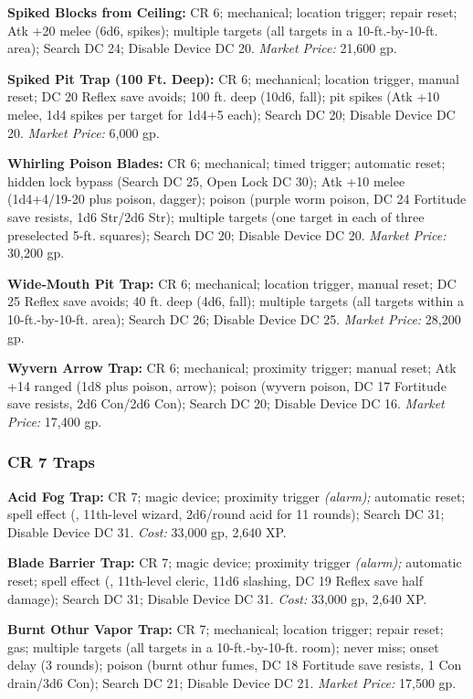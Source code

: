 \textbf{Spiked Blocks from Ceiling:} CR 6; mechanical; location trigger; repair 
reset; Atk +20 melee (6d6, spikes); multiple targets (all targets in a 10-ft.-by-10-ft. 
area); Search DC 24; Disable Device DC 20. \textit{Market Price:} 21,600 gp.

\textbf{Spiked Pit Trap (100 Ft. Deep):} CR 6; mechanical; location trigger, manual 
reset; DC 20 Reflex save avoids; 100 ft. deep (10d6, fall); pit spikes (Atk +10 
melee, 1d4 spikes per target for 1d4+5 each); Search DC 20; Disable Device DC 20. 
\textit{Market Price:} 6,000 gp.

\textbf{Whirling Poison Blades:} CR 6; mechanical; timed trigger; automatic reset; 
hidden lock bypass (Search DC 25, Open Lock DC 30); Atk +10 melee (1d4+4/19-20 
plus poison, dagger); poison (purple worm poison, DC 24 Fortitude save resists, 
1d6 Str/2d6 Str); multiple targets (one target in each of three preselected 5-ft. 
squares); Search DC 20; Disable Device DC 20. \textit{Market Price:} 30,200 gp.

\textbf{Wide-Mouth Pit Trap:} CR 6; mechanical; location trigger, manual reset; 
DC 25 Reflex save avoids; 40 ft. deep (4d6, fall); multiple targets (all targets 
within a 10-ft.-by-10-ft. area); Search DC 26; Disable Device DC 25. \textit{Market 
Price:} 28,200 gp.

\textbf{Wyvern Arrow Trap:} CR 6; mechanical; proximity trigger; manual reset; 
Atk +14 ranged (1d8 plus poison, arrow); poison (wyvern poison, DC 17 Fortitude 
save resists, 2d6 Con/2d6 Con); Search DC 20; Disable Device DC 16. \textit{Market 
Price:} 17,400 gp. 

\subsubsection{CR 7 Traps}

\textbf{Acid Fog Trap:} CR 7; magic device; proximity trigger 
\textit{(alarm); }automatic reset; spell effect (, 11th-level 
wizard, 2d6/round acid for 11 rounds); Search DC 31; Disable Device DC 31. \textit{Cost: 
}33,000 gp, 2,640 XP.

\textbf{Blade Barrier Trap:} CR 7; magic device; proximity trigger 
\textit{(alarm); }automatic reset; spell effect (, 11th-level 
cleric, 11d6 slashing, DC 19 Reflex save half damage); Search DC 31; Disable Device 
DC 31. \textit{Cost:} 33,000 gp, 2,640 XP.

\textbf{Burnt Othur Vapor Trap:} CR 7; mechanical; location trigger; repair reset; 
gas; multiple targets (all targets in a 10-ft.-by-10-ft. room); never miss; onset 
delay (3 rounds); poison (burnt othur fumes, DC 18 Fortitude save resists, 1 Con 
drain/3d6 Con); Search DC 21; Disable Device DC 21. \textit{Market Price:} 17,500 
gp.

